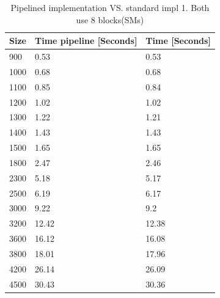 \documentclass[draft, final]{vutinfth} %
\begin{document}
			\begin{table}[!ht]
				\centering
				\caption{Pipelined implementation VS. standard impl 1. Both use 8 blocks(SMs)}
				\label{my-label}
				\begin{tabular}{|l|l|l|}
					\hline
					\textbf{Size} & \textbf{Time pipeline {[}Seconds{]}} & \textbf{Time {[}Seconds{]}} \\ \hline
					900           & 0.53                                 & 0.53                        \\ \hline
					1000          & 0.68                                 & 0.68                        \\ \hline
					1100          & 0.85                                 & 0.84                        \\ \hline
					1200          & 1.02                                 & 1.02                        \\ \hline
					1300          & 1.22                                 & 1.21                        \\ \hline
					1400          & 1.43                                 & 1.43                        \\ \hline
					1500          & 1.65                                 & 1.65                        \\ \hline
					1800          & 2.47                                 & 2.46                        \\ \hline
					2300          & 5.18                                 & 5.17                        \\ \hline
					2500          & 6.19                                 & 6.17                        \\ \hline
					3000          & 9.22                                 & 9.2                         \\ \hline
					3200          & 12.42                                & 12.38                       \\ \hline
					3600          & 16.12                                & 16.08                       \\ \hline
					3800          & 18.01                                & 17.96                       \\ \hline
					4200          & 26.14                                & 26.09                       \\ \hline
					4500          & 30.43                                & 30.36                       \\ \hline
				\end{tabular}
			\end{table}
\end{document}
